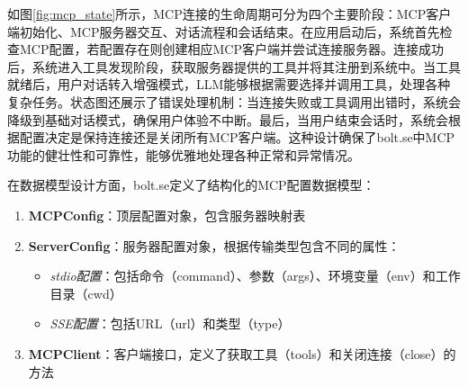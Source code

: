    
    
    
    
    

如图\ref{fig:mcp_state}所示，MCP连接的生命周期可分为四个主要阶段：MCP客户端初始化、MCP服务器交互、对话流程和会话结束。在应用启动后，系统首先检查MCP配置，若配置存在则创建相应MCP客户端并尝试连接服务器。连接成功后，系统进入工具发现阶段，获取服务器提供的工具并将其注册到系统中。当工具就绪后，用户对话转入增强模式，LLM能够根据需要选择并调用工具，处理各种复杂任务。状态图还展示了错误处理机制：当连接失败或工具调用出错时，系统会降级到基础对话模式，确保用户体验不中断。最后，当用户结束会话时，系统会根据配置决定是保持连接还是关闭所有MCP客户端。这种设计确保了bolt.se中MCP功能的健壮性和可靠性，能够优雅地处理各种正常和异常情况。

在数据模型设计方面，bolt.se定义了结构化的MCP配置数据模型：

\begin{enumerate}
  \item \textbf{MCPConfig}：顶层配置对象，包含服务器映射表
  
  \item \textbf{ServerConfig}：服务器配置对象，根据传输类型包含不同的属性：
    \begin{itemize}
      \item \textit{stdio配置}：包括命令（command）、参数（args）、环境变量（env）和工作目录（cwd）
      \item \textit{SSE配置}：包括URL（url）和类型（type）
    \end{itemize}
  
  \item \textbf{MCPClient}：客户端接口，定义了获取工具（tools）和关闭连接（close）的方法
\end{enumerate}

